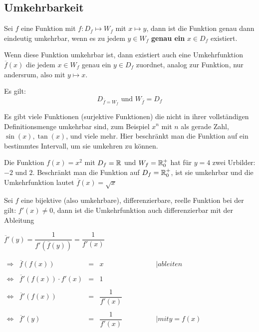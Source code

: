 \documentclass[main.tex]{subfiles}
\begin{document}
\subsection{Umkehrbarkeit}

\begin{Definition}
	Sei $f$ eine Funktion mit $f:D_{f}\mapsto W_{f}$ mit $x\mapsto y$, dann ist die Funktion genau dann eindeutig umkehrbar, wenn es zu jedem $y \in W_{f}$ \textbf{genau ein} $x \in D_{f}$ existiert.

	Wenn diese Funktion umkehrbar ist, dann existiert auch eine Umkehrfunktion $\overline{f}(x)$ die jedem $x \in W_{f}$ genau ein $y\in D_{f}$ zuordnet, analog zur Funktion, nur andersrum, also mit $y\mapsto x$.

	Es gilt:
	$$D_{\overline{f} = W_{f}} \text{ und } W_{\overline{f}}=D_{f}$$
\end{Definition}

\begin{Bemerkung}
	Es gibt viele Funktionen (surjektive Funktionen) die nicht in ihrer vollständigen Definitionsmenge umkehrbar sind, zum Beispiel $x^n$ mit $n$ als gerade Zahl, $\sin(x), \tan(x)$, und viele mehr.  Hier beschränkt man die Funktion auf ein bestimmtes Intervall, um sie umkehren zu können.
	
	Die Funktion $f(x)=x^2$ mit $D_{f}=\mathbb{R}$ und $W_{f}=\mathbb{R}_{0}^{+}$ hat für $y=4$ zwei Urbilder: $-2$ und $2$. Beschränkt man die Funktion auf $D_{f}=\mathbb{R}_{0}^{+}$, ist sie umkehrbar und die Umkehrfunktion lautet $\overline{f}(x)=\sqrt{x}$
\end{Bemerkung}

\begin{Theorem}
	Sei $f$ eine bijektive (also umkehrbare), differenzierbare, reelle Funktion bei der gilt: $f'(x)\neq 0$, dann ist die Umkehrfunktion auch differenzierbar mit der Ableitung

	$\overline{f}'(y) = \dfrac{1}{f'(\overline{f}(y))} = \dfrac{1}{f'(x)}$
\end{Theorem}

\begin{Beweis}
	$\begin{array}{rcccl}
		\Rightarrow & \overline{f}(f(x)) &=& x &\qquad \qquad |  ableiten \\\\
		\Leftrightarrow & \overline{f}'(f(x)) \cdot f'(x) &=& 1 & \\\\
		\Leftrightarrow & \overline{f}'(f(x)) &=& \dfrac{1}{f'(x)}&\\\\
		\Leftrightarrow & \overline{f}'(y) &=& \dfrac{1}{f'(x)}& \qquad \qquad |  mit y=f(x)
	\end{array}$
\end{Beweis}
\end{document}
